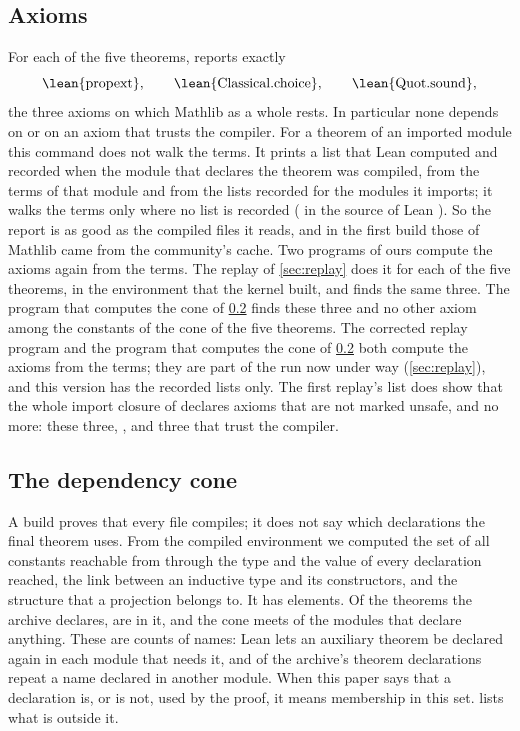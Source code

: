 \subsection{Axioms}\label{sec:axioms}
For each of the five theorems,  reports exactly
\[
\text{\lean{propext}},\qquad \text{\lean{Classical.choice}},\qquad \text{\lean{Quot.sound}},
\]
the three axioms on which Mathlib as a whole rests. In particular none depends on
 or on an axiom that trusts the compiler. For a theorem of an imported module
this command does not walk the terms. It prints a list that Lean computed and recorded when
the module that declares the theorem was compiled, from the terms of that module and from the
lists recorded for the modules it imports; it walks the terms only where no list is recorded
( in the source of Lean \leanversion{}). So the report is
as good as the compiled files it reads, and in the first build those of Mathlib came from the
community's cache.
\ifsecondrun
Two programs of ours compute the axioms again from the terms. The replay of
\cref{sec:replay} does it for each of the five theorems, in the environment that the kernel
built, and finds the same three. The program that computes the cone of \cref{sec:cone} finds
these three and no other axiom among the constants of the cone of the five theorems.
\else
The corrected replay program and the program that computes the cone of \cref{sec:cone} both
compute the axioms from the terms; they are part of the run now under way (\cref{sec:replay}),
and this version has the recorded lists only. The first replay's list does show that the
whole import closure of  declares \replayaxioms{} axioms that are not marked
unsafe, and no more: these three, , and three that trust the compiler.
\fi

\subsection{The dependency cone}\label{sec:cone}
A build proves that every file compiles; it does not say which declarations the final theorem
uses. From the compiled environment we computed the set of all constants reachable from
 through the type and the value of every declaration reached, the
link between an inductive type and its constructors, and the structure that a projection
belongs to. It has
\conesize{} elements. Of the \projtheorems{} theorems the archive declares,
\coneprojtheorems{} are in it, and the cone meets \coneprojmodules{} of the \projmodules{}
modules that declare anything. These are counts of names: Lean lets an auxiliary theorem be
declared again in each module that needs it, and \repeatedtheorems{} of the archive's theorem
declarations repeat a name declared in another module. When this paper says that a declaration
is, or is not, used by the proof, it means membership in this set.  lists
what is outside it.


